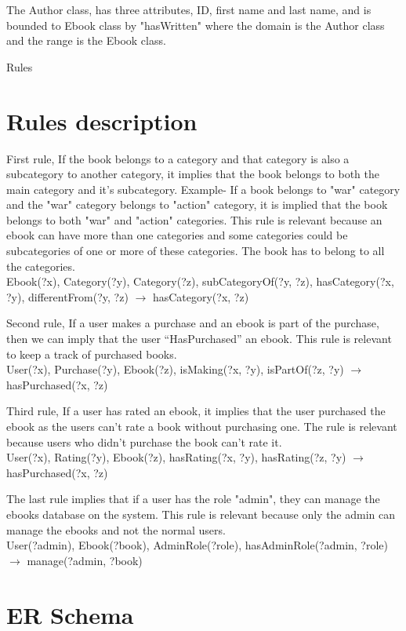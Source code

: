 ﻿\documentclass[a4paper,11pt]{article}
\begin{document}
The Author class, has three attributes, ID, first name and last name, and is bounded to Ebook class by "hasWritten" where the domain is the Author class and the range is the Ebook class. 

Rules

\section{Rules description}
First rule, If the book belongs to a category and that category is also a subcategory to another category, it implies that the book belongs to both the main category and it's subcategory. Example- If a book belongs to "war" category and the "war" category belongs to "action" category, it is implied that the book belongs to both "war" and "action" categories. This rule is relevant because an ebook can have more than one categories and some categories could be subcategories of one or more of these categories. The book has to belong to all the categories.\\
Ebook(?x), Category(?y), Category(?z), subCategoryOf(?y, ?z), hasCategory(?x, ?y), differentFrom(?y, ?z) $\rightarrow$ hasCategory(?x, ?z)

Second rule, If a user makes a purchase and an ebook is part of the purchase, then we can imply that the user “HasPurchased” an ebook. This rule is relevant to keep a track of purchased books. \\
User(?x), Purchase(?y), Ebook(?z), isMaking(?x, ?y), isPartOf(?z, ?y) $\rightarrow$ hasPurchased(?x, ?z)

Third rule, If a user has rated an ebook, it implies that the user purchased the ebook as the users can't rate a book without purchasing one. The rule is relevant because users who didn't purchase the book can't rate it. \\

User(?x), Rating(?y), Ebook(?z), hasRating(?x, ?y), hasRating(?z, ?y) $\rightarrow$ hasPurchased(?x, ?z)

The last rule implies that if a user has the role "admin", they can manage the ebooks database on the system. This rule is relevant because only the admin can manage the ebooks and not the normal users. \\
User(?admin), Ebook(?book), AdminRole(?role), hasAdminRole(?admin, ?role) $\rightarrow$ manage(?admin, ?book)

\section{ER Schema}
\end{document}
